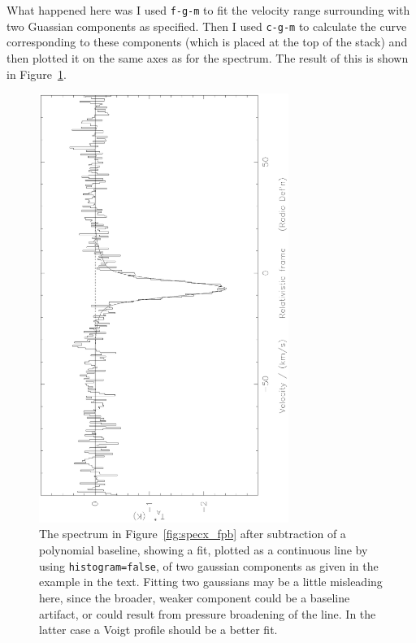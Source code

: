 \documentclass[11pt,twoside]{article}
\begin{document}
What happened here was I used {\tt f-g-m} to fit the velocity range
surrounding with two Guassian components as specified. Then I used
{\tt c-g-m} to calculate the curve corresponding to these components
(which is placed at the top of the stack) and then plotted it on the
same axes as for the spectrum.  The result of this is shown in
Figure~\ref{fig:specx_fgm}.

\begin{figure}[htb]
\centering
\includegraphics[angle=-90,width=3.2in]{sc8_cgm.ps}
\vspace*{-0.5cm}
\begin{center}
\begin{minipage}[t]{5in}
\caption[A gaussian model fit]
{\small{The spectrum in Figure~\ref{fig:specx_fpb} after subtraction
of a polynomial baseline, showing a fit, plotted as a continuous line
by using {\tt histogram=false}, of two gaussian components as given in
the example in the text. Fitting two gaussians may be a little
misleading here, since the broader, weaker component could be a
baseline artifact, or could result from pressure broadening of the
line. In the latter case a Voigt profile should be a better fit.  }}
\label{fig:specx_fgm}
\end{minipage}
\end{center}
\end{figure}
\end{document}
